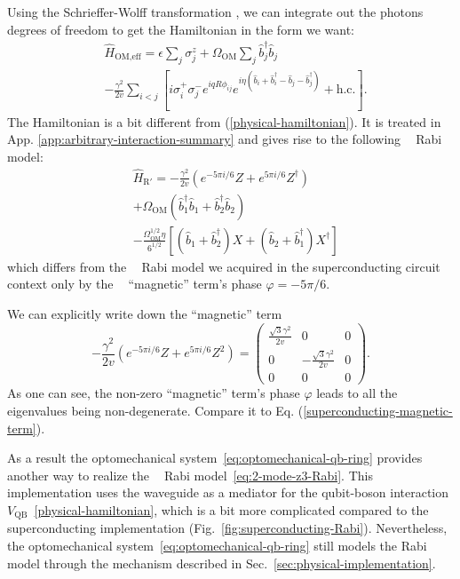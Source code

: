 \documentclass[reprint, aps, prx, amsmath, amssymb, longbibliography, superscriptaddress]{revtex4-2}
\DeclareMathOperator{\Zthree}{\mathbb{Z}_3}
\begin{document}
Using the Schrieffer-Wolff transformation \cite{bravyi_schrieffer_2011}, we can integrate out the photons degrees of freedom to get the Hamiltonian in the form we want:
\begin{equation}
\begin{aligned}
&\hat{H}_{\text{OM,eff}}=  \epsilon \sum_j \sigma_j^z + \Omega_{\text{OM}} \sum_j \hat{b}_j^{\dagger} \hat{b}_j \\
& -\frac{\gamma^2}{2v} \sum_{i<j}\left[i \sigma_i^{+} \sigma_j^- e^{i q R \phi_{i j}} e^{i \eta\left(\hat{b}_i+\hat{b}_i^{\dagger}-\hat{b}_j-\hat{b}_j^{\dagger}\right)}+\text {h.c.}\right].
\end{aligned}
\end{equation}
The Hamiltonian is a bit different from (\ref{physical-hamiltonian}). It is treated in App. \ref{app:arbitrary-interaction-summary} and gives rise to the following $\Zthree$ Rabi model:
\begin{equation}
\begin{aligned}
    &\hat H_{\text{R}'}= - \frac{\gamma^2}{2v} (e^{-5\pi i/6} Z + e^{5\pi i/6} Z^{\dagger}) \\
    &+ \Omega_{\text{OM}} (\hat b_1^{\dagger} \hat b_1 + \hat b_2^{\dagger} \hat b_2) \\
    &- \frac{\Omega_{\text{OM}}^{1/2} \eta}{6^{1/2}}\left[(\hat b_1 + \hat b_2^{\dagger}) X  + (\hat b_2 + \hat b_1^{\dagger}) X^{\dagger}  \right]
\end{aligned}
\end{equation}
which differs from the $\Zthree $ Rabi model we acquired in the superconducting circuit context only by the $\Zthree$ ``magnetic'' term's phase $\varphi = - 5\pi/6$.

We can explicitly write down the ``magnetic'' term
\begin{equation}
    - \frac{\gamma^2}{2v} (e^{-5\pi i/6} Z + e^{5\pi i/6} Z^2) = \begin{pmatrix}
        \frac{\sqrt{3}\gamma^2}{2v} & 0 & 0 \\ 0 & -\frac{\sqrt{3}\gamma^2}{2v} & 0 \\ 0 & 0 & 0 
    \end{pmatrix}.
\end{equation}
As one can see, the non-zero ``magnetic'' term's phase $\varphi$ leads to all the eigenvalues being non-degenerate. Compare it to Eq. (\ref{superconducting-magnetic-term}).

As a result the optomechanical system~\eqref{eq:optomechanical-qb-ring} provides another way to realize the $\Zthree$ Rabi model~\eqref{eq:2-mode-z3-Rabi}. This implementation uses the waveguide as a mediator for the qubit-boson interaction $V_{\text{QB}}$~\eqref{physical-hamiltonian}, which is a bit more complicated compared to the superconducting implementation (Fig.~\ref{fig:superconducting-Rabi}). Nevertheless, the optomechanical system~\eqref{eq:optomechanical-qb-ring} still models the Rabi model through the mechanism described in Sec.~\ref{sec:physical-implementation}.
\end{document}
